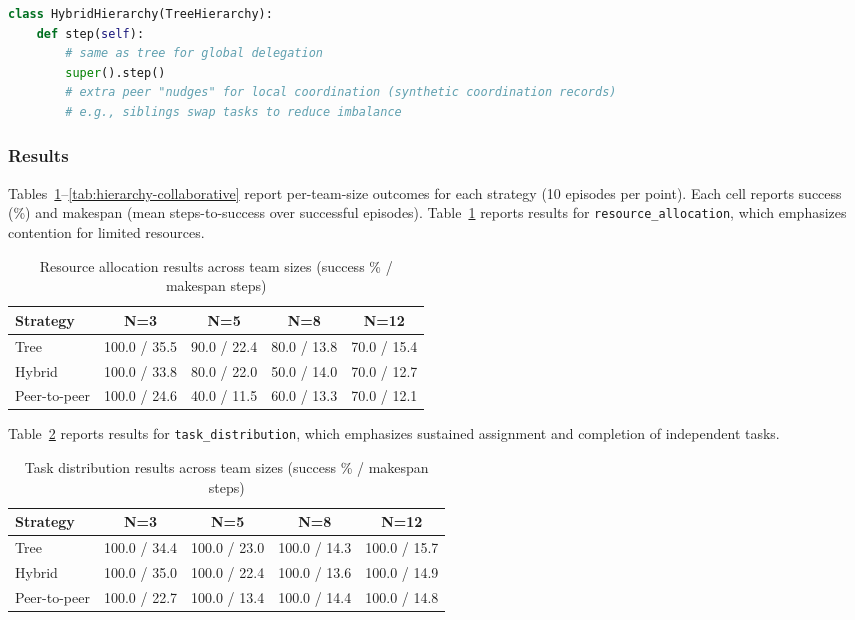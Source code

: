 \begin{lstlisting}[language=Python, caption={Hybrid: hierarchical delegation with peer side-channels}, label={lst:hybrid-simplified}]
class HybridHierarchy(TreeHierarchy):
    def step(self):
        # same as tree for global delegation
        super().step()
        # extra peer "nudges" for local coordination (synthetic coordination records)
        # e.g., siblings swap tasks to reduce imbalance
\end{lstlisting}

\subsubsection{Results}
Tables~\ref{tab:hierarchy-resource-allocation}--\ref{tab:hierarchy-collaborative} report per-team-size outcomes for each strategy (10 episodes per point). Each cell reports success (\%) and makespan (mean steps-to-success over successful episodes).
Table~\ref{tab:hierarchy-resource-allocation} reports results for \texttt{resource\_allocation}, which emphasizes contention for limited resources.

\begin{table}[H]
\centering
\caption{Resource allocation results across team sizes (success \% / makespan steps)}
\label{tab:hierarchy-resource-allocation}
\begin{tabular}{l|c|c|c|c}
\toprule
\textbf{Strategy} & \textbf{N=3} & \textbf{N=5} & \textbf{N=8} & \textbf{N=12} \\
\midrule
Tree         & 100.0 / 35.5 & 90.0 / 22.4 & 80.0 / 13.8 & 70.0 / 15.4 \\
Hybrid       & 100.0 / 33.8 & 80.0 / 22.0 & 50.0 / 14.0 & 70.0 / 12.7 \\
Peer-to-peer & 100.0 / 24.6 & 40.0 / 11.5 & 60.0 / 13.3 & 70.0 / 12.1 \\
\bottomrule
\end{tabular}
\end{table}

Table~\ref{tab:hierarchy-task-distribution} reports results for \texttt{task\_distribution}, which emphasizes sustained assignment and completion of independent tasks.

\begin{table}[H]
\centering
\caption{Task distribution results across team sizes (success \% / makespan steps)}
\label{tab:hierarchy-task-distribution}
\begin{tabular}{l|c|c|c|c}
\toprule
\textbf{Strategy} & \textbf{N=3} & \textbf{N=5} & \textbf{N=8} & \textbf{N=12} \\
\midrule
Tree         & 100.0 / 34.4 & 100.0 / 23.0 & 100.0 / 14.3 & 100.0 / 15.7 \\
Hybrid       & 100.0 / 35.0 & 100.0 / 22.4 & 100.0 / 13.6 & 100.0 / 14.9 \\
Peer-to-peer & 100.0 / 22.7 & 100.0 / 13.4 & 100.0 / 14.4 & 100.0 / 14.8 \\
\bottomrule
\end{tabular}
\end{table}

